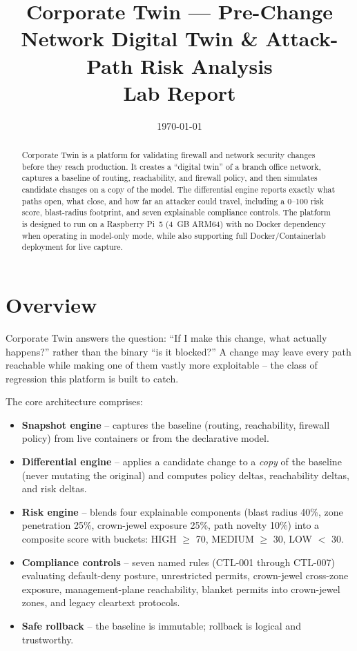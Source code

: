 \documentclass[11pt,a4paper]{article}
\title{Corporate Twin — Pre-Change Network Digital Twin \& Attack-Path Risk Analysis\\
\vspace{0.5cm} \large Lab Report}
\author{}
\date{\today}
\begin{document}
\maketitle

\begin{abstract}
Corporate Twin is a platform for validating firewall and network security changes
before they reach production. It creates a ``digital twin'' of a branch office
network, captures a baseline of routing, reachability, and firewall policy, and
then simulates candidate changes on a copy of the model. The differential engine
reports exactly what paths open, what close, and how far an attacker could travel,
including a 0--100 risk score, blast-radius footprint, and seven explainable
compliance controls. The platform is designed to run on a Raspberry Pi~5 (4~GB
ARM64) with no Docker dependency when operating in model-only mode, while also
supporting full Docker/Containerlab deployment for live capture.
\end{abstract}

\section{Overview}
Corporate Twin answers the question: ``If I make this change, what actually happens?''
rather than the binary ``is it blocked?'' A change may leave every path reachable while
making one of them vastly more exploitable -- the class of regression this platform is
built to catch.

The core architecture comprises:
\begin{itemize}
  \item \textbf{Snapshot engine} -- captures the baseline (routing, reachability, firewall
        policy) from live containers or from the declarative model.
  \item \textbf{Differential engine} -- applies a candidate change to a \emph{copy} of the
        baseline (never mutating the original) and computes policy deltas, reachability
        deltas, and risk deltas.
  \item \textbf{Risk engine} -- blends four explainable components (blast radius 40\%,
        zone penetration 25\%, crown-jewel exposure 25\%, path novelty 10\%) into a
        composite score with buckets: HIGH $\ge$ 70, MEDIUM $\ge$ 30, LOW $<$ 30.
  \item \textbf{Compliance controls} -- seven named rules (CTL-001 through CTL-007)
        evaluating default-deny posture, unrestricted permits, crown-jewel cross-zone
        exposure, management-plane reachability, blanket permits into crown-jewel zones,
        and legacy cleartext protocols.
  \item \textbf{Safe rollback} -- the baseline is immutable; rollback is logical and
        trustworthy.
\end{itemize}
\end{document}
